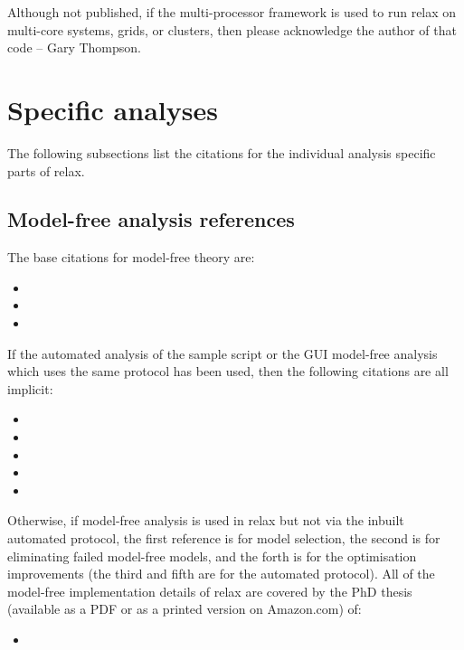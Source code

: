Although not published, if the multi-processor framework is used to run relax on multi-core systems, grids, or clusters, then please acknowledge the author of that code -- Gary Thompson.




\section*{Specific analyses}

The following subsections list the citations for the individual analysis specific parts of relax.



\subsection*{Model-free analysis references}

The base citations for model-free theory are:
\begin{itemize}
  \item {}
  \item {}
  \item {}
\end{itemize}

If the automated analysis of the  sample script or the GUI model-free analysis which uses the same protocol has been used, then the following citations are all implicit:
\begin{itemize}
  \item {}
  \item {}
  \item {}
  \item {}
  \item {}
\end{itemize}

Otherwise, if model-free analysis is used in relax but not via the inbuilt automated protocol, the first reference is for model selection, the second is for eliminating failed model-free models, and the forth is for the optimisation improvements (the third and fifth are for the automated protocol).
All of the model-free implementation details of relax are covered by the PhD thesis (available as a PDF or as a printed version on Amazon.com) of:
\begin{itemize}
  \item {}
\end{itemize}

